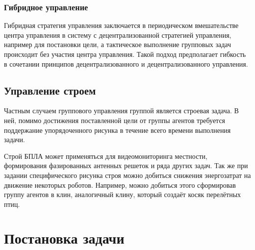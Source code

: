 \documentclass[a4paper, 14pt]{extarticle}
\let\Oldsection\section
\renewcommand{\section}{\FloatBarrier\Oldsection}
\let\Oldsubsection\subsection
\renewcommand{\subsection}{\FloatBarrier\Oldsubsection}
\let\Oldsubsubsection\subsubsection
\renewcommand{\subsubsection}{\FloatBarrier\Oldsubsubsection}
\begin{document}
\subsubsection{Гибридное управление}
Гибридная стратегия управления заключается в периодическом вмешательстве
центра управления в систему с децентрализованной стратегией управления,
например для постановки цели, а тактическое выполнение групповых задач
происходит без участия центра управления. Такой подход предполагает
гибкость в сочетании принципов децентрализованного и децентрализованного
управления. \par
\subsection{Управление строем}
Частным случаем группового управления группой является строевая задача. В ней, помимо достижения поставленной цели от группы агентов требуется поддержание упорядоченного рисунка в течение всего времени выполнения задачи. \par 
Строй БПЛА может применяться для видеомониторинга местности, формирования фазированных антенных решеток и ряда других задач. Так же при задании специфического рисунка строя можно добиться снижения энергозатрат на движение некоторых роботов. Например, можно добиться этого сформировав группу агентов в клин, аналогичный клину, который создаёт косяк перелётных птиц.
\section{Постановка задачи}
\end{document}
